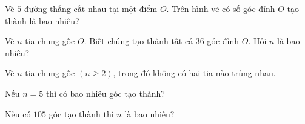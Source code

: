 \begin{bt}%
Vẽ $5$ đường thẳng cắt nhau tại một điểm $O$. Trên hình vẽ có số góc đỉnh $O$ tạo thành là bao nhiêu?
\end{bt}

\begin{bt}%
Vẽ $n$ tia chung gốc $O$. Biết chúng tạo thành tất cả $36$ góc đỉnh $O$. Hỏi $n$ là bao nhiêu?

\end{bt}
\begin{bt}%
Vẽ $n$ tia chung gốc $(n\geq 2)$, trong đó không có hai tia nào trùng nhau.
\begin{enumEX}{1}
\item Nếu $n=5$ thì có bao nhiêu góc tạo thành?
\item Nếu có $105$ góc tạo thành thì $n$ là bao nhiêu?
\end{enumEX}
\end{bt}